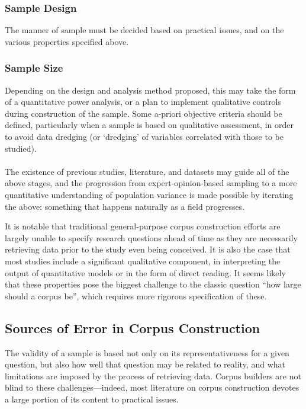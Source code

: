 \subsubsection{Sample Design}
The manner of sample must be decided based on practical issues, and on the various properties specified above.

\subsubsection{Sample Size}
Depending on the design and analysis method proposed, this may take the form of a quantitative power analysis, or a plan to implement qualitative controls during construction of the sample.  Some a-priori objective criteria should be defined, particularly when a sample is based on qualitative assessment, in order to avoid data dredging (or `dredging' of variables correlated with those to be studied).

\paragraph{}
The existence of previous studies, literature, and datasets may guide all of the above stages, and the progression from expert-opinion-based sampling to a more quantitative understanding of population variance is made possible by iterating the above: something that happens naturally as a field progresses.

It is notable that traditional general-purpose corpus construction efforts are largely unable to specify research questions ahead of time as they are necessarily retrieving data prior to the study even being conceived.  It is also the case that most studies include a significant qualitative component, in interpreting the output of quantitative models or in the form of direct reading\cite{rayson2008keysem}.
It seems likely that these properties pose the biggest challenge to the classic question ``how large should a corpus be'', which requires more rigorous specification of these.






\subsection{Sources of Error in Corpus Construction}
The validity of a sample is based not only on its representativeness for a given question, but also how well that question may be related to reality, and what limitations are imposed by the process of retrieving data.
Corpus builders are not blind to these challenges---indeed, most literature on corpus construction devotes a large portion of its content to practical issues\cite{wynne2005developing,atkins1992corpus,EagTcwgCtypeaglespreliminary}.

